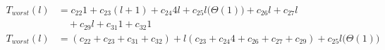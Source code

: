 \begin{subequations}
\label{eq:mergelines-delete}
\begin{align}
\label{eq:mergelines-delete-1}
T_{worst}(l)& =
c_{22}1
+ c_{23}(l + 1)
+ c_{24}4l
+ c_{25}l\bigl(\Theta(1)\bigr)
+ c_{26}l
+ c_{27}l
\\
& \quad
+ c_{29}l
+ c_{31}1
+ c_{32}1
\nonumber \\
\label{eq:mergelines-delete-2}
T_{worst}(l)& =
(c_{22} + c_{23} + c_{31} + c_{32})
+ l(c_{23} + c_{24}4 + c_{26} + c_{27} + c_{29})
+ c_{25}l\bigl(\Theta(1)\bigr)
\end{align}
\end{subequations}
